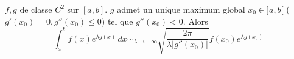 \documentclass[]{report}
\begin{document}
\begin{prop}{}{}
    $f,g$ de classe $C^2$ sur $[a,b]$. $g$ admet un unique maximum global $x_0\in ]a,b[$ ($g'(x_0)=0,g''(x_0)\le 0$) tel que $g''(x_0)<0$. Alors \\
    \[\int_{a}^{b} f(x) e^{\lambda g(x)}\, dx  \sim_{\lambda \to +\infty} \sqrt{\frac{2\pi}{\lambda \left|g''(x_0)\right|}} f(x_0) e^{\lambda g(x_0)}\]
\end{prop}
\end{document}
